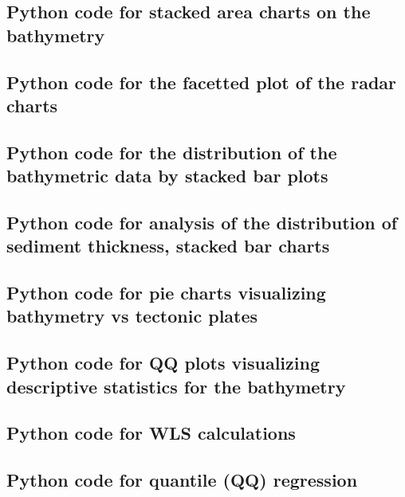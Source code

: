 \documentclass[11pt,a4paper]{report}
\begin{document}
{\begin{appendices}
\subsection{Python code for stacked area charts on the bathymetry}\label{P:17}


\subsection{Python code for the facetted plot of the radar charts}\label{P:18}


\subsection{Python code for the distribution of the bathymetric data by stacked bar plots}\label{P:19}


\subsection{Python code for analysis of the distribution of sediment thickness, stacked bar charts }\label{P:20}


\subsection{Python code for pie charts visualizing bathymetry vs tectonic plates}\label{P:21}


\subsection{Python code for QQ plots visualizing descriptive statistics for the bathymetry}\label{P:22}


\subsection{Python code for WLS calculations}\label{P:23}


\subsection{Python code for quantile (QQ) regression}\label{P:24}



\end{appendices}}
\end{document}
